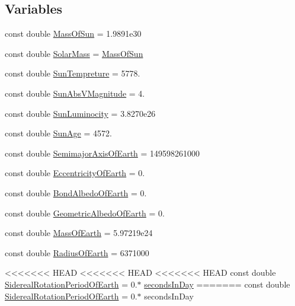 \subsection*{Variables}
\begin{DoxyCompactItemize}
\item 
const double \hyperlink{namespace_e_g_x_phys_a6e84ae13f1dbcecb215af787bbc12cd6}{Mass\+Of\+Sun} = 1.\+9891e30
\item 
const double \hyperlink{namespace_e_g_x_phys_aa8636def23e66bc4ad32394a088b3950}{Solar\+Mass} = \hyperlink{namespace_e_g_x_phys_a6e84ae13f1dbcecb215af787bbc12cd6}{Mass\+Of\+Sun}
\item 
const double \hyperlink{namespace_e_g_x_phys_a97be71e7f8ca4f7813362bc1dca66db5}{Sun\+Tempreture} = 5778.
\item 
const double \hyperlink{namespace_e_g_x_phys_a61266dc1aaacdd9a9bd0f2fa92aa21c9}{Sun\+Abs\+V\+Magnitude} = 4.
\item 
const double \hyperlink{namespace_e_g_x_phys_a3987543f6972eb72eb2c07d39520b43e}{Sun\+Luminocity} = 3.\+8270e26
\item 
const double \hyperlink{namespace_e_g_x_phys_a173216c099d7915fb16e6416902fcbb8}{Sun\+Age} = 4572.
\item 
const double \hyperlink{namespace_e_g_x_phys_ad1bdca5cec4a0f4a4b8a18ead61de6d9}{Semimajor\+Axis\+Of\+Earth} = 149598261000
\item 
const double \hyperlink{namespace_e_g_x_phys_a327bbaf59d546f8524d6fb9da919d939}{Eccentricity\+Of\+Earth} = 0.
\item 
const double \hyperlink{namespace_e_g_x_phys_a932fff28fce4321fdbf9abc5c1783dc9}{Bond\+Albedo\+Of\+Earth} = 0.
\item 
const double \hyperlink{namespace_e_g_x_phys_aae01fb8ed365fc5de7acebeef34b7351}{Geometric\+Albedo\+Of\+Earth} = 0.
\item 
const double \hyperlink{namespace_e_g_x_phys_ace4a9d8c0b21215536857f4c1087a4e8}{Mass\+Of\+Earth} = 5.\+97219e24
\item 
const double \hyperlink{namespace_e_g_x_phys_a11a2d4a914eb43c4095e225358293a45}{Radius\+Of\+Earth} = 6371000
\item 
<<<<<<< HEAD
<<<<<<< HEAD
<<<<<<< HEAD
const double \hyperlink{namespace_e_g_x_phys_a34a388ac3f9196bb3cdbdbee5ff3cdb7}{Sidereal\+Rotation\+Period\+Of\+Earth} = 0.$\ast$ \hyperlink{namespace_e_g_x_phys_ab4f86327f64403b843077ecc189ce52b}{seconds\+In\+Day}
=======
const double \hyperlink{namespace_e_g_x_phys_a34a388ac3f9196bb3cdbdbee5ff3cdb7}{Sidereal\+Rotation\+Period\+Of\+Earth} = 0.$\ast$ seconds\+In\+Day

\end{DoxyCompactItemize}
